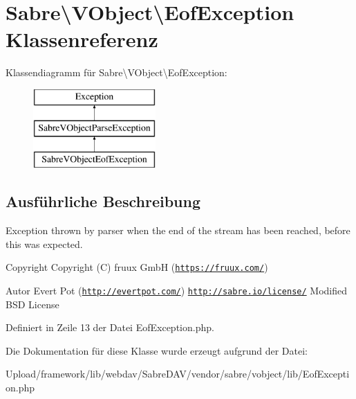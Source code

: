 \hypertarget{class_sabre_1_1_v_object_1_1_eof_exception}{}\section{Sabre\textbackslash{}V\+Object\textbackslash{}Eof\+Exception Klassenreferenz}
\label{class_sabre_1_1_v_object_1_1_eof_exception}
Klassendiagramm für Sabre\textbackslash{}V\+Object\textbackslash{}Eof\+Exception\+:\begin{figure}[H]
\begin{center}
\leavevmode
\includegraphics[height=3.000000cm]{class_sabre_1_1_v_object_1_1_eof_exception}
\end{center}
\end{figure}


\subsection{Ausführliche Beschreibung}
Exception thrown by parser when the end of the stream has been reached, before this was expected.

\begin{DoxyCopyright}{Copyright}
Copyright (C) fruux GmbH (\href{https://fruux.com/}{\tt https\+://fruux.\+com/}) 
\end{DoxyCopyright}
\begin{DoxyAuthor}{Autor}
Evert Pot (\href{http://evertpot.com/}{\tt http\+://evertpot.\+com/})  \href{http://sabre.io/license/}{\tt http\+://sabre.\+io/license/} Modified B\+SD License 
\end{DoxyAuthor}


Definiert in Zeile 13 der Datei Eof\+Exception.\+php.



Die Dokumentation für diese Klasse wurde erzeugt aufgrund der Datei\+:\begin{DoxyCompactItemize}
\item 
Upload/framework/lib/webdav/\+Sabre\+D\+A\+V/vendor/sabre/vobject/lib/Eof\+Exception.\+php\end{DoxyCompactItemize}
